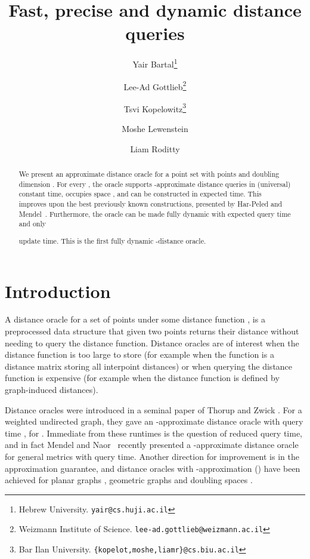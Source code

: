 \documentclass[11pt]{article}
\begin{document}
\title{Fast, precise and dynamic distance queries}
\author{
\and Yair Bartal\thanks{
 Hebrew University.
 \texttt{\scriptsize yair@cs.huji.ac.il}
}
\and Lee-Ad Gottlieb\thanks{
 Weizmann Institute of Science.
 \texttt{\scriptsize lee-ad.gottlieb@weizmann.ac.il}
}
\and Tsvi Kopelowitz\thanks{
 Bar Ilan University.
 \texttt{\scriptsize \{kopelot,moshe,liamr\}@cs.biu.ac.il}
}
\and Moshe Lewenstein\footnotemark[3]
\and Liam Roditty\footnotemark[3]
}


\date{}
\maketitle
\thispagestyle{empty}

\begin{abstract}\noindent
We present an approximate distance oracle for a point set  with  points 
and doubling dimension . For every , the oracle supports 
-approximate distance queries in (universal) constant time, occupies 
space , and can be 
constructed in  expected time. This improves upon the best previously known 
constructions, presented by Har-Peled and Mendel~\cite{HaPe06}. Furthermore, 
the oracle can be made fully dynamic with expected  query time and only 
 
update time. This is the first fully dynamic -distance oracle.

\end{abstract}

\newpage
\setcounter{page}{1}

\section{Introduction}
A distance oracle for a set of  points  under some distance 
function , is a preprocessed data structure that given two 
points  returns their distance without needing to query the 
distance function. Distance oracles are of interest when the distance 
function is too large to store (for example when the function is a distance 
matrix storing all  interpoint distances) or when querying the 
distance function is expensive (for example when the distance function is 
defined by graph-induced distances).

Distance oracles were introduced in a seminal paper of Thorup and Zwick
\cite{ThZw05}. For a weighted undirected graph, they gave an -approximate 
distance oracle with query time , for . Immediate from these
runtimes is the question of reduced query time,
and in fact Mendel and Naor~\cite{MeNa06} recently presented a 
-approximate distance oracle for general metrics with  query time.
Another direction for improvement is in the approximation guarantee, and 
distance oracles with -approximation () 
have been achieved for planar graphs \cite{Klein02,Thorup04},
geometric graphs \cite{GuLeNaSm08} and doubling spaces \cite{HaPe06}.
\end{document}
